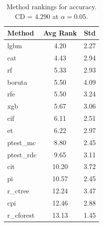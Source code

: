 \begin{table}[h]
\centering
\caption{Method rankings for accuracy. CD = 4.290 at $\alpha=0.05$.}
\label{tab:ranks_accuracy}
\begin{tabular}{lcc}
\toprule
Method & Avg Rank & Std \\
\midrule
lgbm & 4.20 & 2.27 \\
cat & 4.43 & 2.94 \\
rf & 5.33 & 2.93 \\
boruta & 5.50 & 4.09 \\
rfe & 5.50 & 3.24 \\
xgb & 5.67 & 3.06 \\
cif & 6.11 & 2.51 \\
et & 6.22 & 2.97 \\
ptest_mc & 8.80 & 2.45 \\
ptest_rdc & 9.65 & 3.11 \\
cit & 10.20 & 3.72 \\
pi & 10.57 & 2.45 \\
r_ctree & 12.24 & 3.47 \\
cpi & 12.46 & 2.88 \\
r_cforest & 13.13 & 1.45 \\
\bottomrule
\end{tabular}
\end{table}